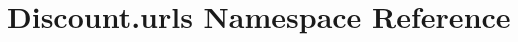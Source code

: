 \hypertarget{namespace_discount_1_1urls}{}\section{Discount.\+urls Namespace Reference}
\label{namespace_discount_1_1urls}
